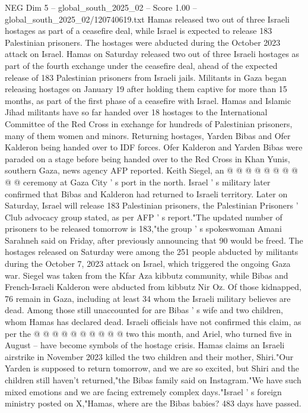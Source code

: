 \begin{textsample}{NEG Dim 5 – global\_south\_2025\_02 – Score 1.00 – global\_south\_2025\_02/120740619.txt}  \label{ex:f5_neg_308}
Hamas released two out of three Israeli hostages as part of a ceasefire deal, while Israel is expected to release 183 Palestinian prisoners.
The hostages were abducted during the October 2023 attack on Israel.
Hamas on Saturday released two out of three Israeli hostages as part of the fourth exchange under the ceasefire deal, ahead of the expected release of 183 Palestinian prisoners from Israeli jails.
Militants in Gaza began releasing hostages on January 19 after holding them captive for more than 15 months, as part of the first phase of a ceasefire with Israel.
Hamas and Islamic Jihad militants have so far handed over 18 hostages to the International Committee of the Red Cross in exchange for hundreds of Palestinian prisoners, many of them women and minors.
Returning hostages, Yarden Bibas and Ofer Kalderon being handed over to IDF forces.
Ofer Kalderon and Yarden Bibas were paraded on a stage before being handed over to the Red Cross in Khan Yunis, southern Gaza, news agency AFP reported.
Keith Siegel, an @ @ @ @ @ @ @ @ @ @ ceremony at Gaza City ' s port in the north.
Israel ' s military later confirmed that Bibas and Kalderon had returned to Israeli territory.
Later on Saturday, Israel will release 183 Palestinian prisoners, the Palestinian Prisoners ' Club advocacy group stated, as per AFP ' s report."The updated number of prisoners to be released tomorrow is 183,"the group ' s spokeswoman Amani Sarahneh said on Friday, after previously announcing that 90 would be freed.
The hostages released on Saturday were among the 251 people abducted by militants during the October 7, 2023 attack on Israel, which triggered the ongoing Gaza war.
Siegel was taken from the Kfar Aza kibbutz community, while Bibas and French-Israeli Kalderon were abducted from kibbutz Nir Oz.
Of those kidnapped, 76 remain in Gaza, including at least 34 whom the Israeli military believes are dead.
Among those still unaccounted for are Bibas ' s wife and two children, whom Hamas has declared dead.
Israeli officials have not confirmed this claim, as per the @ @ @ @ @ @ @ @ @ @ two this month, and Ariel, who turned five in August -- have become symbols of the hostage crisis.
Hamas claims an Israeli airstrike in November 2023 killed the two children and their mother, Shiri."Our Yarden is supposed to return tomorrow, and we are so excited, but Shiri and the children still haven't returned,"the Bibas family said on Instagram."We have such mixed emotions and we are facing extremely complex days."Israel ' s foreign ministry posted on X,"Hamas, where are the Bibas babies? 483 days have passed.

\end{textsample}
